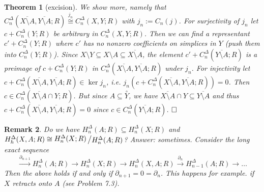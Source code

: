 \documentclass[11pt]{book}
\numberwithin{dummy}{section}
\newtheorem{theorem}{Theorem}[section]
\newtheorem{remark}[theorem]{Remark}
\theoremstyle{nonumberbreak}
\newenvironment{pr}[1][]{\ifthenelse{\equal{#1}{}}{\proof}{\proof[#1]}\rm}{\endproof}
\newcommand{\la}{\longrightarrow}
\newcommand{\slant}[2]{{\raisebox{.1em}{$#1$}\left/\raisebox{-.1em}{$#2$}\right.}}
\begin{document}
\begin{spacing}{1.4}
\begin{theorem}[excision]
\begin{pr}
We show more, namely that $C_n^{\Delta}(\overline{X\setminus A}, \overline{Y \setminus A}; R) \overset{j_n}{\cong} C_n^{\Delta}(X,Y;R)$ with $j_n:=C_n(j)$. For surjectivity of $j_n$ let $c+ C_n^{\Delta}(Y;R)$ be arbitrary in $C_n^{\Delta}(X,Y;R)$. Then we can find a representant $c' + C_n^{\Delta}(Y;R)$ where $c'$ has no nonzero coefficients on simplices in $Y$ (push them into $C_n^{\Delta}(Y;R)$). Since $X \setminus Y \subseteq X\setminus A \subseteq \overline{X \setminus A}$, the element $c' + C_n^{\Delta}(\overline{Y \setminus A};R)$ is a preimage of $c+ C_n^{\Delta}(Y;R)$ in $C_n^{\Delta}(\overline{X \setminus A}, \overline{Y \setminus A};R)$ under $j_n$. For injectivity let $c+ C_n^{\Delta}(\overline{X \setminus A}, \overline{Y \setminus A};R) \in \ker j_n$, i.e. $j_n\left(c+ C_n^{\Delta}(\overline{X \setminus A}, \overline{Y \setminus A};R)\right) = 0$. Then $c \in C_n^{\Delta}(\overline{X\setminus A} \cap Y;R)$. But since $A \subseteq \overset{\circ}{Y}$, we have $\overline{X \setminus A} \cap Y \subseteq \overline{Y \setminus A}$ and thus $c+C_n^{\Delta}(\overline{X \setminus A}, \overline{Y \setminus A};R) =0$ since $c \in C_n^{\Delta}(\overline{Y\setminus A};R)$. $\hfill \Box$




\end{pr}
\end{theorem}


\begin{remark}
Do we have $H_n^{\Delta}(A;R) \subseteq H_n^{\Delta}(X;R)$ and $H_h^{\Delta}(X,A;R) \cong \slant{H_n^{\Delta}(X;R)}{H_n^{\Delta}(A;R)}$? Answer: sometimes. Consider the long exact sequence
$$\overset{\partial_{n+1}}{\la} H_n^{\Delta}(A;R) \la H_n^{\Delta}(X;R) \la H_n^{\Delta}(X,A;R) \overset{\partial_n}{\la} H_{n-1}^{\Delta}(A;R) \la \ldots$$
Then the above holds if and only if $\partial_{n+1}=0 = \partial_n$. This happens for example. if $X$ retracts onto $A$ (see Problem 7.3).


\end{remark}



\end{spacing}
\end{document}
